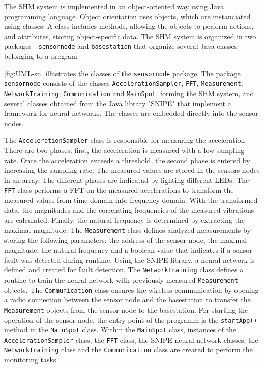 \documentclass[12pt,a4paper]{scrartcl}
\begin{document}
The SHM system is implemented in an object-oriented way using Java programming language. 
Object orientation uses objects, which are instanciated using classes. 
A class includes methods, allowing the objects to perform actions, and attributes, storing object-specific data.
The SHM system is organized in two packages---\texttt{sensornode} and \texttt{basestation} that organize several Java classes belonging to a program.

\autoref{fig:UML-sn} illustrates the classes of the \texttt{sensor\-node} package.
The package \texttt{sensor\-node} consists of the classes \texttt{Acceleration\-Sampler}, \texttt{FFT}, \texttt{Measure\-ment}, \texttt{Network\-Training}, \texttt{Communi\-cation} and \texttt{Main\-Spot}, forming the SHM system, and several classes obtained from the Java library "SNIPE" \citep{SNIPE} that implement a framework for neural networks.
The classes are embedded directly into the sensor nodes.

The \texttt{Acceleration\-Sampler} class is responsible for measuring the acceleration.
There are two phases: first, the acceleration is measured with a low sampling rate.
Once the acceleration exceeds a threshold, the second phase is entered by increasing the sampling rate. 
The measured values are stored in the sensors nodes in an array.
The different phases are indicatad by lighting different LEDs.
The \texttt{FFT} class performs a FFT on the measured accelerations to transform the measured values from time domain into frequency domain. 
With the transformed data, the magnitudes and the correlating frequencies of the measured vibrations are calculated.
Finally, the natural frequency is determined by extracting the maximal magnitude.
The \texttt{Measure\-ment} class defines analyzed measurements by storing the following parameters: the address of the sensor node, the maximal magnitude, the natural frequency and a boolean value that indicates if a sensor fault was detected during runtime.
Using the SNIPE library, a neural network is defined and created for fault detection.
The \texttt{Network\-Training} class defines a routine to train the neural network with previously measured \texttt{Measure\-ment} objects.
The \texttt{Communi\-cation} class ensures the wireless communication by opening a radio connection between the sensor node and the basestation to transfer the \texttt{Measure\-ment} objects from the sensor node to the basestation.
For starting the operation of the sensor node, the entry point of the programm is the \texttt{start\-App()} method in the \texttt{Main\-Spot} class. 
Within the \texttt{Main\-Spot} class, instances of the \texttt{Acceleration\-Sampler} class, the \texttt{FFT} class, the SNIPE neural network classes, the \texttt{Network\-Training} class and the \texttt{Communi\-cation} class are created to perform the monitoring tasks.
\end{document}
